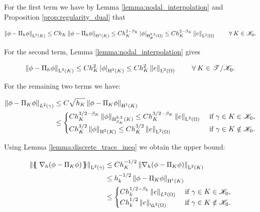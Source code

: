 \documentclass[a4paper,11pt]{article}
\begin{document}
{For the first term we have by Lemma \ref{lemma:nodal_interpolation} and Proposition \ref{prop:regularity_dual} that

\begin{equation}
 \left\|\phi -  \Pi_{h}\phi\right\|_{\operatorname L^{2}(K)} \leq  C h_{K}\left\|\phi -  \Pi_{h}\phi\right\|_{\operatorname H^{1}(K)} \leq C h_{K}^{2-\beta_{K}}\left|\phi\right|_{\operatorname H^{2,2}_{\boldsymbol \beta}(\Omega)} \leq C h_{K}^{2-\beta_{K}} \left\|e\right\|_{\operatorname L^{2}(\Omega)} \quad  \quad\:\forall\: K \in \mathscr K_{0}.   
\label{eq:interp_ineq_weighted}
\end{equation}

For the second term, Lemma \ref{lemma:nodal_interpolation} gives

\begin{equation}
   \left\|\phi -  \Pi_{h}\phi\right\|_{\operatorname L^{2}(K)} \leq C h_{K}^{2}\left|\phi\right|_{\operatorname H^{2}(K)} \leq C h_{K}^{2} \left\|e\right\|_{\operatorname L^{2}(\Omega)} \quad  \quad\:\forall\: K \in \mathscr T^{} \slash \mathscr K_{0}. 
\label{eq:interp_ineq}
\end{equation}

For the remaining two terms we have:

\begin{equation}
\begin{split}
\left\|\phi - \Pi_{K}\phi\right\|_{L^{2}(\gamma)} &\leq C \sqrt{h_{K}} \left\|\phi - \Pi_{K}\phi\right\|_{\operatorname H^{1}(K)} \\
&\leq \begin{cases}
C h_{K}^{3/2-\beta_{K}} \left\|\phi\right\|_{\operatorname H^{2,2}_{\beta_{K}}(K)} \leq C h_{K}^{3/2-\beta_{K}} \left\|e\right\|_{\operatorname L^{2}(\Omega)} & \text{ if } \gamma \in K \in \mathscr K_{0},\\
C h_{K}^{3/2} \left\|\phi\right\|_{\operatorname H^{2}(K)} \leq C h_{K}^{3/2} \left\|e\right\|_{\operatorname L^{2}(\Omega)} & \text{ if } \gamma \in K \notin \mathscr K_{0}.
\end{cases}
\end{split}
\label{eq:trace_ineq}
\end{equation}

Using Lemma \ref{lemma:discrete_trace_ineq} we obtain the upper bound:

\begin{equation}
\begin{split}
   \Norm{\avg{\nabla_{h}(\phi - \Pi_{K}\phi)}}_{\leb{2}(\gamma)} & \leq C h_{K}^{-1/2} \Norm{\nabla_{h}(
     \phi - \Pi_{K}\phi)}_{\leb{2}(K)} \\
  & \leq h_{k}^{-1/2} \Norm{\phi - \Pi_{K}\phi}_{\sobh{1}(K)}\\
  &\leq  \begin{cases}
    C h_{k}^{1/2-\beta_{k}} \Norm{e}_{L^{2}(\W)} &  \text{ if } \gamma \in K \in \cK_{0}, \\
    C h_{k}^{1/2} \Norm{e}_{\L^{2}(\W)} &  \text{ if } \gamma \in K \notin \cK_{0}.
\end{cases}
\end{split}
\label{eq:grad_ineq}
\end{equation}


}
\end{document}
